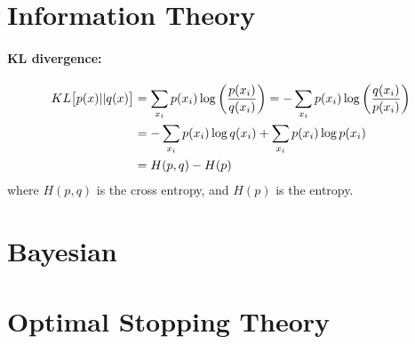 \documentclass[11pt]{article}
\begin{document}
\section{Information Theory}
\paragraph{KL divergence:}
\begin{align}
  KL\big[p(x) || q(x)\big] &= \sum_{x_i} p(x_i) \log\left(\frac{p(x_i)}{q(x_i)}
                             \right) = -\sum_{x_i} p(x_i)
                             \log\left(\frac{q(x_i)}{p(x_i)} \right) \nonumber\\
  &= -\sum_{x_i} p(x_i) \log q(x_i) + \sum_{x_i} p(x_i) \log p(x_i) \nonumber\\
  &= H(p,q) - H(p)
\end{align}
where $H(p,q)$ is the cross entropy, and $H(p)$ is the entropy.


\section{Bayesian}



\section{Optimal Stopping Theory}





\end{document}
